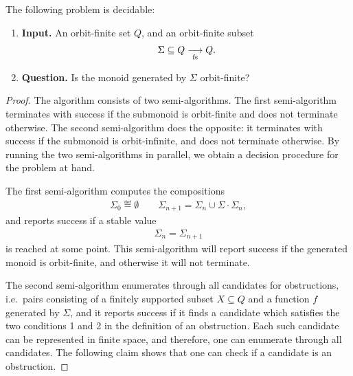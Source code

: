 \begin{corollary}
    \label{cor:decide-orbit-finite-submonoids}
    The following problem is decidable: 
    \begin{enumerate}
        \item \textbf{Input.} An orbit-finite set $Q$, and an orbit-finite subset 
        \begin{align*}
        \Sigma \subseteq Q \underset {\text{fs}} \longrightarrow Q.
        \end{align*}
        \item \textbf{Question.} Is the monoid generated by $\Sigma$ orbit-finite?
    \end{enumerate}
\end{corollary}
\begin{proof}
    The algorithm consists of two semi-algorithms. The first semi-algorithm terminates with success if the submonoid is orbit-finite and does not terminate otherwise. The second semi-algorithm does the opposite: it terminates with success if the submonoid is orbit-infinite, and does not terminate otherwise. By running the two semi-algorithms in parallel, we obtain a decision procedure for the problem at hand.
    
    The first semi-algorithm computes the compositions 
    \begin{align*}
    \Sigma_0 \eqdef \emptyset \qquad \Sigma_{n+1} = \Sigma_n \cup \Sigma \cdot \Sigma_n,
    \end{align*}
    and reports success if a stable value 
    \begin{align*}
    \Sigma_n = \Sigma_{n+1}
    \end{align*}
    is reached at some point. This semi-algorithm will report success if the generated monoid is orbit-finite, and otherwise it will not terminate. 
    
    The second semi-algorithm enumerates through all candidates for obstructions, i.e.~pairs consisting of a finitely supported subset $X \subseteq Q$ and a function $f$ generated by $\Sigma$, and it reports success if it finds a candidate which satisfies the two conditions 1 and 2 in the definition of an obstruction. Each such candidate can be represented in finite space, and therefore, one can enumerate through all candidates. The following claim shows that one can check if a candidate is an obstruction.
    

\end{proof}

